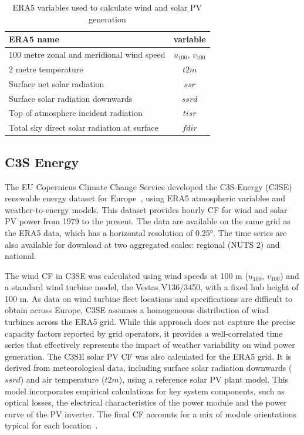 \documentclass[preprint, 12pt]{elsarticle}
\begin{document}
\begin{table}[h!]
	\centering
	\caption{ERA5 variables used to calculate wind and solar PV generation}
	\begin{tabular}{|l|c|}
		\hline
		{\textbf{ERA5 name}}      & \textbf{variable} \\ \hline
		100 metre zonal and meridional wind speed   & $u_{100}$, $v_{100}$ \\
		2 metre temperature                         & $t2m$ \\
		Surface net solar radiation                 & $ssr$ \\
		Surface solar radiation downwards           & $ssrd$  \\
		Top of atmosphere incident radiation        & $tisr$  \\
		Total sky direct solar radiation at surface & $fdir$  \\ \hline
	\end{tabular}
	\label{tab:var_name}
\end{table}

\subsection{C3S Energy}
\label{sec:c3se}

The EU Copernicus Climate Change Service developed the C3S-Energy (C3SE) renewable energy dataset for Europe~\citep{dubus2023energy}, using ERA5 atmospheric variables and weather-to-energy models. This dataset provides hourly CF for wind and solar PV power from 1979 to the present. The data are available on the same grid as the ERA5 data, which has a horizontal resolution of 0.25°. The time series are also available for download at two aggregated scales: regional (NUTS 2) and national.

The wind CF in C3SE was calculated using wind speeds at 100 m ($u_{100}$, $v_{100}$) and a standard wind turbine model, the Vestas V136/3450, with a fixed hub height of 100 m. As data on wind turbine fleet locations and specifications are difficult to obtain across Europe, C3SE assumes a homogeneous distribution of wind turbines across the ERA5 grid. While this approach does not capture the precise capacity factors reported by grid operators, it provides a well-correlated time series that effectively represents the impact of weather variability on wind power generation. The C3SE solar PV CF was also calculated for the ERA5 grid. It is derived from meteorological data, including surface solar radiation downwards ($ssrd$) and air temperature ($t2m$), using a reference solar PV plant model.  This model incorporates empirical calculations for key system components, such as optical losses, the electrical characteristics of the power module and the power curve of the PV inverter. The final CF accounts for a mix of module orientations typical for each location~\citep{saintdrenan2018solar}. 
\end{document}
